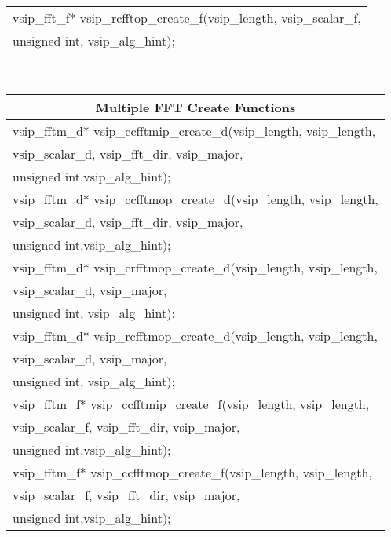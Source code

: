 {\begin{tabular}[H]{|l|}
vsip\_fft\_f* vsip\_rcfftop\_create\_f(vsip\_length, vsip\_scalar\_f,\\*\hspace{.7cm}unsigned int, vsip\_alg\_hint);\\\hline
\end{tabular}
\\\hspace*{0.5cm} 
\begin{tabular}[H]{|l|}
\multicolumn{1}{c}{\rmfamily \bfseries Multiple FFT Create Functions}\\ \hline
vsip\_fftm\_d* vsip\_ccfftmip\_create\_d(vsip\_length, vsip\_length,\\*\hspace{.7cm}vsip\_scalar\_d, vsip\_fft\_dir, vsip\_major,\\*\hspace{.7cm} unsigned int,vsip\_alg\_hint);\\
vsip\_fftm\_d* vsip\_ccfftmop\_create\_d(vsip\_length, vsip\_length,\\*\hspace{.7cm}vsip\_scalar\_d, vsip\_fft\_dir, vsip\_major,\\*\hspace{.7cm} unsigned int,vsip\_alg\_hint);\\
vsip\_fftm\_d* vsip\_crfftmop\_create\_d(vsip\_length, vsip\_length,\\*\hspace{.7cm}vsip\_scalar\_d, vsip\_major,\\*\hspace{.7cm} unsigned int, vsip\_alg\_hint);\\
vsip\_fftm\_d* vsip\_rcfftmop\_create\_d(vsip\_length, vsip\_length,\\*\hspace{.7cm}vsip\_scalar\_d, vsip\_major,\\*\hspace{.7cm} unsigned int, vsip\_alg\_hint);\\
vsip\_fftm\_f* vsip\_ccfftmip\_create\_f(vsip\_length, vsip\_length,\\*\hspace{.7cm}vsip\_scalar\_f, vsip\_fft\_dir, vsip\_major,\\*\hspace{.7cm} unsigned int,vsip\_alg\_hint);\\
vsip\_fftm\_f* vsip\_ccfftmop\_create\_f(vsip\_length, vsip\_length,\\*\hspace{.7cm}vsip\_scalar\_f, vsip\_fft\_dir, vsip\_major,\\*\hspace{.7cm} unsigned int,vsip\_alg\_hint);\\

\end{tabular}}
